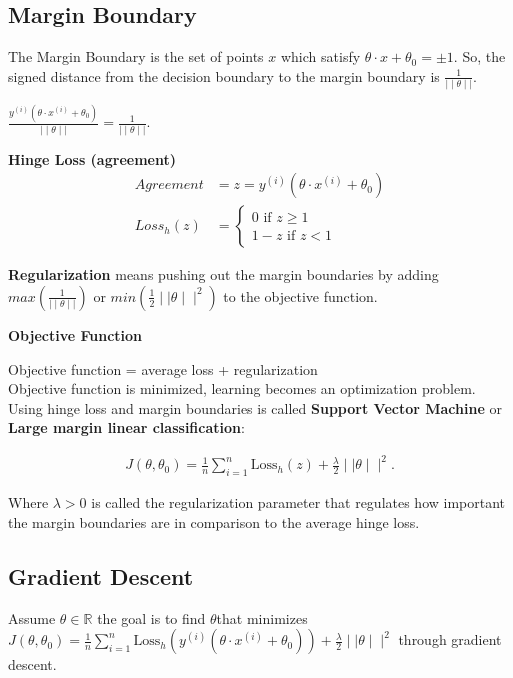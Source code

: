 \subsection{Margin Boundary}

The Margin Boundary is the set of points  $x$  which satisfy $\theta \cdot x + \theta _0= \pm 1$. So, the signed distance from the decision boundary to the margin boundary is $\displaystyle \frac{1}{\mid \mid \theta \mid \mid }$.

$\frac{y^{(i)}(\theta \cdot x^{(i)} + \theta _0)}{\mid \mid \theta \mid \mid }=\frac{1}{\mid \mid \theta \mid \mid }.$

\textbf{Hinge Loss (agreement)}
\begin{align*}
Agreement &= z = y^{(i)}(\theta \cdot x^{(i)} + \theta _0)\\
Loss_h(z) &= 
\begin{cases}
		 0 \text{ if } z \geq 1\\
		 1-z \text{ if } z < 1
\end{cases} 
\end{align*}

\textbf{Regularization} means pushing out the margin boundaries by adding $max(\frac{1}{\mid \mid \theta \mid \mid })$ or $min(\frac{1}{2}\mid \mid \theta \mid \mid^2)$ to the objective function.

\textbf{Objective Function}

Objective function = average loss + regularization\\

Objective function is minimized, learning becomes an optimization problem. Using hinge loss and margin boundaries is called \textbf{Support Vector Machine} or \textbf{Large margin linear classification}:

\begin{align*}
J(\theta , \theta _0) = \frac{1}{n} \sum _{i=1}^{n} \text {Loss}_ h (z) + \frac{\lambda }{2} \mid \mid \theta \mid \mid ^2.
\end{align*}

Where $\lambda > 0$ is called the regularization parameter that regulates how important the margin boundaries are in comparison to the average hinge loss.

\subsection{Gradient Descent}

Assume $\theta \in \mathbb{R}$ the goal is to find $\theta $that minimizes $J(\theta , \theta _0) = \frac{1}{n} \sum _{i=1}^{n} \text {Loss}_ h (y^{(i)} (\theta \cdot x^{(i)} + \theta _0 )) + \frac{\lambda }{2} \mid \mid \theta \mid \mid ^2$ through gradient descent.\\

